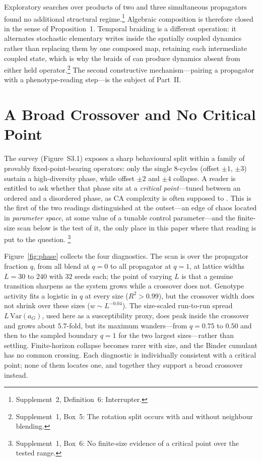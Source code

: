 \documentclass[man,12pt,floatsintext,donotrepeattitle]{apa7}
\newcommand{\secref}[1]{\emph{\nameref{#1}}}
\newcommand{\suppfindingref}[1]{Supplement~1, Box~#1}
\newcommand{\supptheorytext}[2]{Supplement~2, #1: #2.}
\newcommand{\supptheory}[2]{\footnote{\supptheorytext{#1}{#2}}}
\newcommand{\suppfindingtext}[2]{\suppfindingref{#1}: #2.}
\newcommand{\suppfinding}[2]{\footnote{\suppfindingtext{#1}{#2}}}
\begin{document}
Exploratory searches over products of two and three simultaneous propagators
found no additional structural regime.\supptheory{Definition~6}{Interrupter}
Algebraic composition is therefore closed in the sense of
Proposition~1. Temporal braiding is a different operation: it
alternates stochastic elementary writes inside the spatially coupled dynamics
rather than replacing them by one composed map, retaining each intermediate
coupled state, which is why the braids of \secref{sec:braiding} can produce
dynamics absent from either held operator.\suppfinding{5}{The rotation split occurs with and without neighbour blending}
The second constructive mechanism---pairing a propagator with a
phenotype-reading step---is the subject of Part~II.

\section{A Broad Crossover and No Critical Point}
\label{sec:discussion}

The survey (Figure~S3.1) exposes a sharp behavioural split within a
family of provably fixed-point-bearing operators: only the single 8-cycles
(offset $\pm 1$, $\pm 3$) sustain a high-diversity phase, while offset $\pm 2$ and
$\pm 4$ collapse. A reader is entitled to ask whether that phase sits at a
\emph{critical point}---tuned between an ordered and a disordered phase, as CA
complexity is often supposed to \parencite{langton1990computation}. This is the
first of the two readings distinguished at the outset---an edge of chaos located
in \emph{parameter space}, at some value of a tunable control parameter---and
the finite-size scan below is the test of it, the only place in this paper where
that reading is put to the question. \suppfinding{6}{No finite-size evidence of a critical point over the tested range}

Figure~\ref{fig:phase} collects the four diagnostics. The scan is over the
propagator fraction $q$, from all blend at $q=0$ to all propagator at $q=1$, at
lattice widths $L = 30$ to $240$ with $32$ seeds each; the point of varying $L$
is that a genuine transition sharpens as the system grows while a crossover does
not. Genotype activity fits a logistic in $q$ at every size ($R^2 > 0.99$), but
the crossover width does not shrink over these sizes ($w \sim L^{-0.04}$). The
size-scaled run-to-run spread $L\,\mathrm{Var}(a_G)$, used here as a
susceptibility proxy, does peak inside the crossover and grows about $5.7$-fold, but
its maximum wanders---from $q=0.75$ to $0.50$ and then to the sampled boundary
$q=1$ for the two largest sizes---rather than settling. Finite-horizon collapse
becomes rarer with size, and the Binder cumulant has no common crossing. Each
diagnostic is individually consistent with a critical point; none of them
locates one, and together they support a broad crossover instead.
\end{document}
